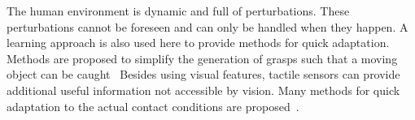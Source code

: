 The human environment is dynamic and full of perturbations. These perturbations cannot be foreseen and can only be handled when they happen. A learning approach is also used here to provide methods for quick adaptation. Methods are proposed to simplify the generation of grasps such that a moving object can be caught~\citep{harada2008fast,kim2012,bidan2013grasp}
Besides using visual features, tactile sensors can provide additional useful information not accessible by vision. Many methods for quick adaptation to the actual contact conditions are proposed~\citep{hsiao2010contact,hsiao2011robust,kazemi2012robust,sauser2011iterative,li2014learning}.




